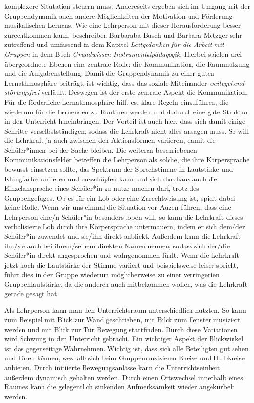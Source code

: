 komplexere Situtation steuern muss. Andereseits ergeben sich im Umgang mit der
Gruppendynamik auch andere Möglichkeiten der Motivation und Förderung
musikalischen Lernens. Wie eine Lehrperson mit dieser Herausforderung besser
zurechtkommen kann, beschreiben Barbaraba Busch und Barbara Metzger sehr
zutreffend und umfassend in dem Kapitel \emph{Leitgedanken für die Arbeit
mit Gruppen} in dem Buch \emph{Grundwissen Instrumentalpädagogik}. Hierbei
spielen drei übergeordnete Ebenen eine zentrale Rolle: die Kommunikation, die
Raumnutzung und die Aufgabenstellung. Damit die Gruppendynamik zu einer guten
Lernathmosphäre beiträgt, ist wichtig, dass das soziale Miteinander
\emph{weitegehend störungsfrei} verläuft. Deswegen ist der erste zentrale Aspekt
die Kommunikation. Für die förderliche Lernathmosphäre hilft es, klare Regeln
einzuführen, die wiederum für die Lernenden zu Routinen werden und dadurch eine
gute Struktur in den Unterricht hineinbringen. Der Vorteil ist auch hier, dass
sich damit einige Schritte verselbstständigen, sodass die Lehrkraft nicht alles
ansagen muss. So will die Lehrkraft ja auch zwischen den Aktionsformen
variieren, damit die Schüler*innen bei der Sache bleiben. Die weiteren
beschriebenen Kommunikationsfelder betreffen die Lehrperson als solche, die ihre
Körpersprache bewusst einsetzen sollte, das Spektrum der Sprechstimme in
Lautstärke und Klangfarbe variieren und ausschöpfen kann und sich durchaus auch
die Einzelansprache eines Schüler*in zu nutze machen darf, trotz des
Gruppengefüges. Ob es für ein Lob oder eine Zurechtweisung ist, spielt dabei
keine Rolle. Wenn wir uns einmal die Situation vor Augen führen, dass eine
Lehrperson eine/n Schüler*in besonders loben will, so kann die Lehrkraft dieses
verbalisierte Lob durch ihre Körpersprache untermauern, indem er sich dem/der
Schüler*in zuwendet und sie/ihn direkt anblickt. Außerdem kann die Lehrkraft
ihn/sie auch bei ihrem/seinem direkten Namen nennen, sodass sich der/die
Schüler*in direkt angesprochen und wahrgenommen fühlt. Wenn die Lehrkraft jetzt
noch die Lautstärke der Stimme variiert und beispielsweise leiser spricht, führt
dies in der Gruppe wiederum möglicherweise zu einer verringerten
Gruppenlautstärke, da die anderen auch mitbekommen wollen, was die Lehrkraft
gerade gesagt hat. 

Als Lehrperson kann man den Unterrichtsraum unterschiedlich nutzten. So kann zum
Beispiel mit Blick zur Wand geschrieben, mit Bilck zum Fenster musiziert werden
und mit Blick zur Tür Bewegung stattfinden. Durch diese Variationen wird Schwung
in den Unterricht gebracht. Ein wichtiger Aspekt der Blickwinkel ist das
gegenseitige Wahrnehmen. Wichtig ist, dass sich alle Beteiligten gut sehen und
hören können, weshalb sich beim Gruppenmusizieren Kreise und Halbkreise
anbieten. Durch initiierte Bewegungsanlässe kann die Unterrichtseinheit außerdem
dynamisch gehalten werden. Durch einen Ortswechsel innerhalb eines Raumes kann
die gelegentlich sinkenden Aufmerksamkeit wieder angekurbelt werden. 

